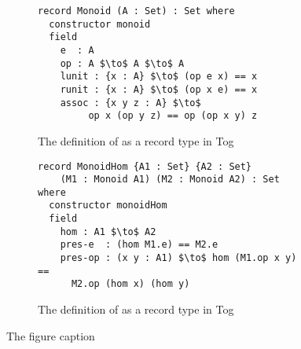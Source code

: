 \documentclass[]{article}
\begin{document}
\begin{figure}
\begin{subfigure}[t]{\textwidth}
\begin{lstlisting}[mathescape]
record Monoid (A : Set) : Set where
  constructor monoid
  field
    e  : A
    op : A $\to$ A $\to$ A
    lunit : {x : A} $\to$ (op e x) == x
    runit : {x : A} $\to$ (op x e) == x
    assoc : {x y z : A} $\to$ 
         op x (op y z) == op (op x y) z
\end{lstlisting}
\caption{The definition of as a record type in Tog}
\end{subfigure}
\hfill 
\begin{subfigure}[t]{\textwidth}
\begin{lstlisting}[mathescape]
record MonoidHom {A1 : Set} {A2 : Set} 
    (M1 : Monoid A1) (M2 : Monoid A2) : Set where
  constructor monoidHom
  field
    hom : A1 $\to$ A2
    pres-e  : (hom M1.e) == M2.e
    pres-op : (x y : A1) $\to$ hom (M1.op x y) ==  
      M2.op (hom x) (hom y)
\end{lstlisting}
\caption{The definition of as a record type in Tog}
\label{fig:monoid_hom}
\end{subfigure}
\caption{The figure caption} 
\end{figure}
\end{document}

